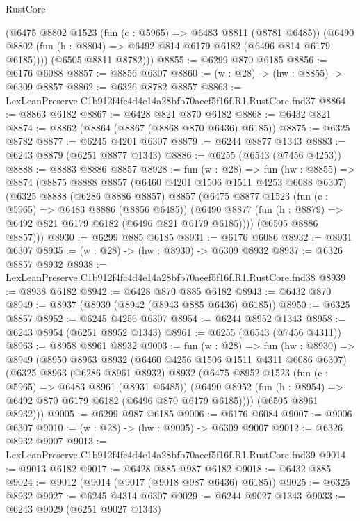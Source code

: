 \begin{lexlean}{RustCore}
\begin{coremodule}
        (@6475
          @8802
          @1523
          (fun (c : @5965) => @6483 @8811 (@8781 @6485))
          (@6490 @8802 (fun (h : @8804) => @6492 @814 @6179 @6182 (@6496 @814 @6179 @6185))))
        (@6505 @8811 @8782)))
@8855 := @6299 @870 @6185
@8856 := @6176 @6088
@8857 := @8856 @6307
@8860 := (w : @28) -> (hw : @8855) -> @6309 @8857
@8862 := @6326 @8782 @8857
@8863 := LexLeanPreserve.C1b912f4fc4d4e14a28bfb70aeef5f16f.R1.RustCore.fnd37
@8864 := @8863 @6182
@8867 := @6428 @821 @870 @6182
@8868 := @6432 @821
@8874 := @8862 (@8864 (@8867 (@8868 @870 @6436) @6185))
@8875 := @6325 @8782
@8877 := @6245 @4201 @6307
@8879 := @6244 @8877 @1343
@8883 := @6243 @8879 (@6251 @8877 @1343)
@8886 := @6255 (@6543 (@7456 @4253))
@8888 := @8883 @8886 @8857
@8928 := fun (w : @28) =>
  fun (hw : @8855) =>
  @8874
    (@8875
      @8888
      @8857
      (@6460 @4201 @1506 @1511 @4253 @6088 @6307)
      (@6325
        @8888
        (@6286 @8886 @8857)
        @8857
        (@6475
          @8877
          @1523
          (fun (c : @5965) => @6483 @8886 (@8856 @6485))
          (@6490 @8877 (fun (h : @8879) => @6492 @821 @6179 @6182 (@6496 @821 @6179 @6185))))
        (@6505 @8886 @8857)))
@8930 := @6299 @885 @6185
@8931 := @6176 @6086
@8932 := @8931 @6307
@8935 := (w : @28) -> (hw : @8930) -> @6309 @8932
@8937 := @6326 @8857 @8932
@8938 := LexLeanPreserve.C1b912f4fc4d4e14a28bfb70aeef5f16f.R1.RustCore.fnd38
@8939 := @8938 @6182
@8942 := @6428 @870 @885 @6182
@8943 := @6432 @870
@8949 := @8937 (@8939 (@8942 (@8943 @885 @6436) @6185))
@8950 := @6325 @8857
@8952 := @6245 @4256 @6307
@8954 := @6244 @8952 @1343
@8958 := @6243 @8954 (@6251 @8952 @1343)
@8961 := @6255 (@6543 (@7456 @4311))
@8963 := @8958 @8961 @8932
@9003 := fun (w : @28) =>
  fun (hw : @8930) =>
  @8949
    (@8950
      @8963
      @8932
      (@6460 @4256 @1506 @1511 @4311 @6086 @6307)
      (@6325
        @8963
        (@6286 @8961 @8932)
        @8932
        (@6475
          @8952
          @1523
          (fun (c : @5965) => @6483 @8961 (@8931 @6485))
          (@6490 @8952 (fun (h : @8954) => @6492 @870 @6179 @6182 (@6496 @870 @6179 @6185))))
        (@6505 @8961 @8932)))
@9005 := @6299 @987 @6185
@9006 := @6176 @6084
@9007 := @9006 @6307
@9010 := (w : @28) -> (hw : @9005) -> @6309 @9007
@9012 := @6326 @8932 @9007
@9013 := LexLeanPreserve.C1b912f4fc4d4e14a28bfb70aeef5f16f.R1.RustCore.fnd39
@9014 := @9013 @6182
@9017 := @6428 @885 @987 @6182
@9018 := @6432 @885
@9024 := @9012 (@9014 (@9017 (@9018 @987 @6436) @6185))
@9025 := @6325 @8932
@9027 := @6245 @4314 @6307
@9029 := @6244 @9027 @1343
@9033 := @6243 @9029 (@6251 @9027 @1343)

\end{coremodule}
\end{lexlean}

